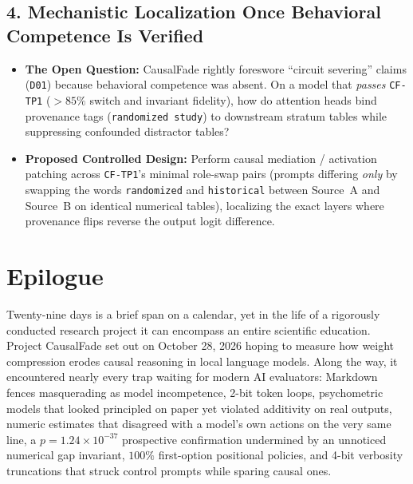 \section{4. Mechanistic Localization Once Behavioral Competence Is Verified}
\begin{itemize}
  \item \textbf{The Open Question:} CausalFade rightly foreswore ``circuit severing'' claims (\texttt{D01}) because behavioral competence was absent. On a model that \emph{passes} \texttt{CF-TP1} ($>85\%$ switch and invariant fidelity), how do attention heads bind provenance tags (\texttt{randomized study}) to downstream stratum tables while suppressing confounded distractor tables?
  \item \textbf{Proposed Controlled Design:} Perform causal mediation / activation patching across \texttt{CF-TP1}'s minimal role-swap pairs (prompts differing \emph{only} by swapping the words \texttt{randomized} and \texttt{historical} between Source~A and Source~B on identical numerical tables), localizing the exact layers where provenance flips reverse the output logit difference.
\end{itemize}

\chapter{Epilogue}\label{ch:epilogue}

Twenty-nine days is a brief span on a calendar, yet in the life of a rigorously conducted research project it can encompass an entire scientific education. Project CausalFade set out on October 28, 2026 hoping to measure how weight compression erodes causal reasoning in local language models. Along the way, it encountered nearly every trap waiting for modern AI evaluators: Markdown fences masquerading as model incompetence, 2-bit token loops, psychometric models that looked principled on paper yet violated additivity on real outputs, numeric estimates that disagreed with a model's own actions on the very same line, a $p = 1.24 \times 10^{-37}$ prospective confirmation undermined by an unnoticed numerical gap invariant, $100\%$ first-option positional policies, and 4-bit verbosity truncations that struck control prompts while sparing causal ones.

